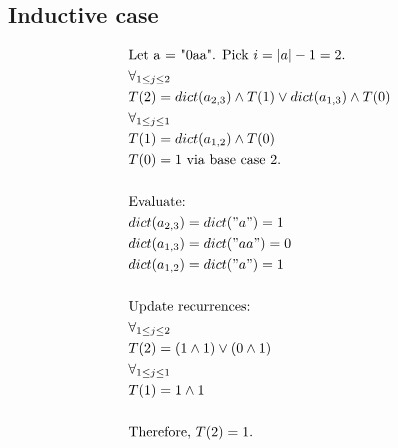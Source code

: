 \documentclass{article}
\begin{document}
		\subsection{Inductive case}	
			\begin{align*}		
				&\text{Let a = "0aa". Pick } i=|a|-1=2.\\	
				&\forall_{1 \leq j \leq 2}\\	
				&T(2) = dict(a_{2,3}) \wedge T(1) \vee dict(a_{1,3}) \wedge T(0)\\
				&\forall_{1 \leq j \leq 1}\\
				&T(1) = dict(a_{1,2}) \wedge T(0)\\			
				&T(0) = 1 \text{ via base case 2.}\\\\
				&\text{Evaluate:}\\
				&dict(a_{2,3})= dict("a") = 1\\				
				&dict(a_{1,3})= dict("aa") = 0\\		
				&dict(a_{1,2})= dict("a") = 1\\\\		
				&\text{Update recurrences:}\\			
				&\forall_{1 \leq j \leq 2}\\			
				&T(2) = (1 \wedge 1) \vee (0 \wedge 1)\\		
				&\forall_{1 \leq j \leq 1}\\		
				&T(1) = 1 \wedge 1\\\\
				&\text{Therefore, } T(2) = 1.
			\end{align*}
	
	
\end{document}
